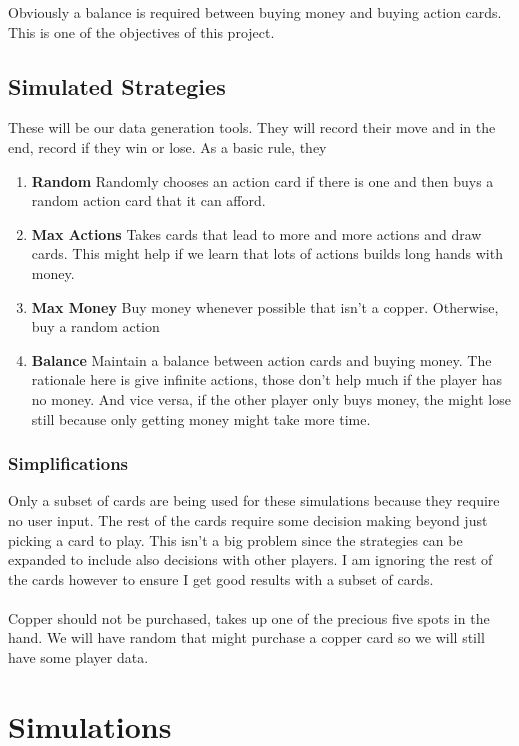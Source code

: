 \documentclass[11pt, oneside]{article}   	%
\begin{document}
Obviously a balance is required between buying money and buying action cards. This is one of the objectives of this project. 


\subsection{Simulated Strategies}

These will be our data generation tools. They will record their move and in the end, record if they win or lose. As a basic rule, they 

	\begin{enumerate}
 		 \item \textbf{Random} Randomly chooses an action card if there is one and then buys a random action card that it can afford.
  		 \item \textbf{Max Actions} Takes cards that lead to more and more actions and draw cards. This might help if we learn that lots of actions builds long hands with money. 
		 \item \textbf{Max Money} Buy money whenever possible that isn't a copper. Otherwise, buy a random action
		 \item \textbf{Balance} Maintain a balance between action cards and buying money. The rationale here is give infinite actions, those don't help much if the player has no money. And vice versa, if the other player only buys money, the might lose still because only getting money might take more time. 
	\end{enumerate}

\subsubsection{Simplifications}

Only a subset of cards are being used for these simulations because they require no user input. The rest of the cards require some decision making beyond just picking a card to play. This isn't a big problem since the strategies can be expanded to include also decisions with other players. I am ignoring the rest of the cards however to ensure I get good results with a subset of cards. \\
\\
Copper should not be purchased, takes up one of the precious five spots in the hand. We will have random that might purchase a copper card so we will still have some player data. 

\section{Simulations}
\end{document}

